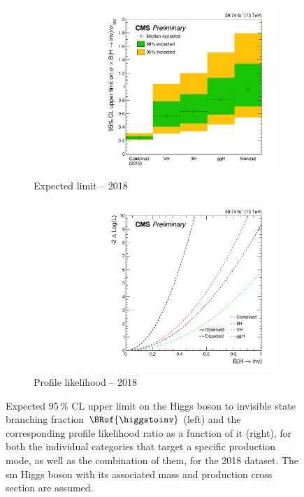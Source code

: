 \begin{figure}[htbp]
    \centering
    \begin{subfigure}[b]{0.45\textwidth}
        \includegraphics[width=\textwidth]{figures/limits/limit_2018_comb_Scenario5.pdf}
        \caption{Expected limit -- 2018}
    \end{subfigure}
    \hspace{0.05\textwidth}
    \begin{subfigure}[b]{0.45\textwidth}
        \includegraphics[width=\textwidth]{figures/likelihood_scan/profile_likelihood_scan_2018_Scenario5.pdf}
        \caption{Profile likelihood -- 2018}
    \end{subfigure}
    \caption[Expected 95\,\% CL upper limit on the Higgs boson to invisible state branching fraction $\BRof{\higgstoinv}$ and the corresponding profile likelihood ratio as a function of it, for both the individual categories that target a specific production mode, as well as the combination of them, for the 2018 dataset]{Expected 95\,\% CL upper limit on the Higgs boson to invisible state branching fraction $\BRof{\higgstoinv}$ (left) and the corresponding profile likelihood ratio as a function of it (right), for both the individual categories that target a specific production mode, as well as the combination of them, for the 2018 dataset. The \acrlong{sm} Higgs boson with its associated mass and production cross section are assumed.}
    \label{fig:htoinv_limit_likelihood_2018}
\end{figure}

